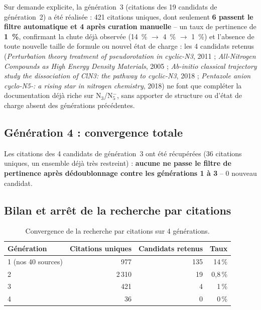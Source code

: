 \documentclass[11pt,a4paper]{article}
\begin{document}
Sur demande explicite, la g\'en\'eration~3 (citations des 19 candidats de
g\'en\'eration~2) a \'et\'e r\'ealis\'ee : 421 citations uniques, dont
seulement \textbf{6 passent le filtre automatique et 4 apr\`es curation
manuelle} -- un taux de pertinence de \textbf{1~\%}, confirmant la chute
d\'ej\`a observ\'ee (14~\% $\to$ 4~\% $\to$ 1~\%) et l'absence de toute
nouvelle taille de formule ou nouvel \'etat de charge : les 4 candidats
retenus (\emph{Perturbation theory treatment of pseudorotation in
cyclic-N3}, 2011 ; \emph{All-Nitrogen Compounds as High Energy Density
Materials}, 2005 ; \emph{Ab-initio classical trajectory study the
dissociation of ClN3: the pathway to cyclic-N3}, 2018 ; \emph{Pentazole
anion cyclo-N5-: a rising star in nitrogen chemistry}, 2018) ne font que
compl\'eter la documentation d\'ej\`a riche sur N$_3$/N$_5^{-}$, sans
apporter de structure ou d'\'etat de charge absent des g\'en\'erations
pr\'ec\'edentes.

\subsection{G\'en\'eration 4 : convergence totale}
\label{sec:citation-search-gen4}

Les citations des 4 candidats de g\'en\'eration~3 ont \'et\'e
r\'ecup\'er\'ees (36 citations uniques, un ensemble d\'ej\`a tr\`es
restreint) : \textbf{aucune ne passe le filtre de pertinence apr\`es
d\'edoublonnage contre les g\'en\'erations 1 \`a 3} -- 0 nouveau
candidat.

\subsection{Bilan et arr\^et de la recherche par citations}

\begin{table}[H]
\centering
\begin{tabular}{lrrr}
\toprule
G\'en\'eration & Citations uniques & Candidats retenus & Taux \\
\midrule
1 (nos 40 sources) & 977 & 135 & 14\,\% \\
2 & 2\,310 & 19 & 0{,}8\,\% \\
3 & 421 & 4 & 1\,\% \\
4 & 36 & 0 & 0\,\% \\
\bottomrule
\end{tabular}
\caption{Convergence de la recherche par citations sur 4 g\'en\'erations.}
\label{tab:citation-convergence}
\end{table}
\end{document}
